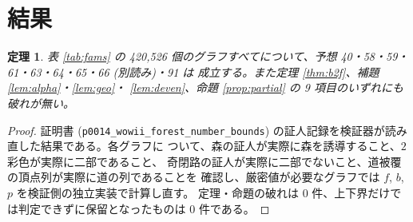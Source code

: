\documentclass[paper=a4,fontsize=10.5pt,jafontsize=10.5pt]{jlreq}
\theoremstyle{plain}
\newtheorem{theorem}{定理}[section]
\theoremstyle{definition}
\begin{document}
\section{結果}\label{sec:results}

\begin{theorem}\label{thm:main}
表 \ref{tab:fams} の 420,526 個のグラフすべてについて、予想 40・58・59・61・63・64・65・66 (別読み)・91 は
成立する。また定理 \ref{thm:b2f}、補題 \ref{lem:alpha}・\ref{lem:geo}・
\ref{lem:deven}、命題 \ref{prop:partial} の 9 項目のいずれにも破れが無い。
\end{theorem}

\begin{proof}
証明書 (\texttt{p0014\_wowii\_forest\_number\_bounds}) の証人記録を検証器が読み直した結果である。各グラフに
ついて、森の証人が実際に森を誘導すること、$2$ 彩色が実際に二部であること、
奇閉路の証人が実際に二部でないこと、道被覆の頂点列が実際に道の列であることを
確認し、厳密値が必要なグラフでは $f$, $b$, $p$ を検証側の独立実装で計算し直す。
定理・命題の破れは 0 件、上下界だけでは判定できずに保留となったものは
0 件である。
\end{proof}
\end{document}
